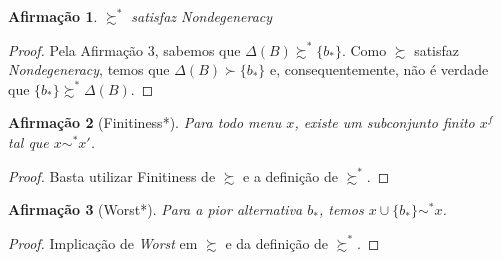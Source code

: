 \documentclass[11pt, a4paper]{article}
\theoremstyle{nonumberplain}
\newtheorem{proof}{Dem.}
\theoremstyle{plain}
\theoremstyle{plain}
\newtheorem{claim}{Afirmação}
\theoremstyle{plain}
\begin{document}
\begin{claim}$\succsim^*$ satisfaz \emph{Nondegeneracy}\end{claim}
\begin{proof}
Pela Afirmação 3, sabemos que $\Delta(B)\succsim^* \{b_*\}$. Como $\succsim$ satisfaz \emph{Nondegeneracy}, temos que $\Delta(B)\succ \{b_*\}$ e, consequentemente, não é verdade que $\{b_*\}\succsim^*\Delta(B)$.
\end{proof}



\begin{claim}[Finitiness*]Para todo menu $x$, existe um subconjunto finito $x^f$ tal que $x\sim^* x'$.\end{claim}
\begin{proof}
Basta utilizar Finitiness de $\succsim$ e a definição de $\succsim^*$. 
\end{proof}

\begin{claim}[Worst*] Para a pior alternativa $b_*$, temos $x\cup\{b_*\}\sim^* x$.\end{claim}
\begin{proof}
Implicação de \textit{Worst} em $\succsim$ e da definição de $\succsim^*$. 
\end{proof}
\end{document}
